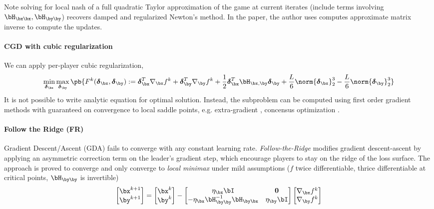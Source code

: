 \documentclass[../summary.tex]{subfiles}
\begin{document}
Note solving for local nash of a full quadratic Taylor approximation of the game at current iterates (include terms involving $\bH_{\bx\bx}, \bH_{\by\by}$) recovers damped and regularized Newton's method. In the paper, the author uses computes approximate matrix inverse to compute the updates.

\paragraph{CGD with cubic regularization} We can apply per-player cubic regularization,
\begin{align*}
    \min_{\bdelta_{\bx}} \max_{\bdelta_{\by}} \pb{
        F^k(\bdelta_{\bx},\bdelta_{\by})
        := \bdelta_{\bx}^T \nabla_{\bx} f^k + \bdelta_{\by}^T \nabla_{\by} f^k + \frac{1}{2} \bdelta_{\bx}^T \bH_{\bx,\by} \bdelta_{\by} + \frac{L}{6}\norm{\bdelta_{\bx}}_2^3 - \frac{L}{6}\norm{\bdelta_{\by}}_2^3
    } 
\end{align*}
It is not possible to write analytic equation for optimal solution. Instead, the subproblem can be computed using first order gradient methods with guaranteed on convergence to local saddle points, e.g. extra-gradient \cite{mokhtariUnifiedAnalysisExtragradient2019}, concensus optimization \cite{meschederNumericsGANs2017}. 


\paragraph{Follow the Ridge (FR)}
Gradient Descent/Ascent (GDA) fails to converge with any constant learning rate. \textit{Follow-the-Ridge} modifies gradient descent-ascent by applying an asymmetric correction term on the leader's gradient step, which encourage players to stay on the ridge of the loss surface. The approach is proved to converge and only converge to \textit{local minimax} under mild assumptions ($f$ twice differentiable, thrice differentiable at critical points, $\bH_{\by\by}$ is invertible)
\begin{align*}
    \begin{bmatrix}
        \bx^{k+1} \\ \by^{k+1}
    \end{bmatrix}
    = 
    \begin{bmatrix}
        \bx^k \\ \by^k
    \end{bmatrix}
    - 
    \begin{bmatrix}
        \eta_{\bx}\bI & \mathbf{0} \\
        - \eta_{\bx} \bH_{\by\by}^{-1} \bH_{\by\bx} & \eta_{\by} \bI
    \end{bmatrix}
    \begin{bmatrix}
        \nabla_{\bx} f^k \\
        \nabla_{\by} f^k
    \end{bmatrix}
\end{align*}
\end{document}
